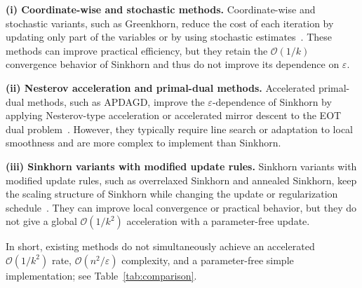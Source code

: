 \documentclass{article}
\theoremstyle{plain}
\theoremstyle{remark}
\begin{document}
\smallskip
\noindent\textbf{(i) Coordinate-wise and stochastic methods.}
Coordinate-wise and stochastic variants, such as Greenkhorn, reduce the cost of each iteration by updating only part of the variables or by using stochastic estimates~\citep{altschuler2017near,lin2019efficient,genevay2016stochastic}. These methods can improve practical efficiency, but they retain the $\mathcal{O}(1/k)$ convergence behavior of Sinkhorn and thus do not improve its dependence on $\varepsilon$.

\smallskip
\noindent\textbf{(ii) Nesterov acceleration and primal-dual methods.}
Accelerated primal-dual methods, such as APDAGD, improve the $\varepsilon$-dependence of Sinkhorn by applying Nesterov-type acceleration or accelerated mirror descent to the EOT dual problem~\citep{dvurechensky2018computational,lin2019efficient}. However, they typically require line search or adaptation to local smoothness and are more complex to implement than Sinkhorn.

\smallskip
\noindent\textbf{(iii) Sinkhorn variants with modified update rules.}
Sinkhorn variants with modified update rules, such as overrelaxed Sinkhorn and annealed Sinkhorn, keep the scaling structure of Sinkhorn while changing the update or regularization schedule~\citep{thibault2021overrelaxed,chizat2024annealed}. They can improve local convergence or practical behavior, but they do not give a global $\mathcal{O}(1/k^2)$ acceleration with a parameter-free update.

\smallskip
In short, existing methods do not simultaneously achieve an accelerated $\mathcal{O}(1/k^2)$ rate, $\mathcal O(n^2/\varepsilon)$ complexity, and a parameter-free simple implementation; see Table~\ref{tab:comparison}.
\end{document}
